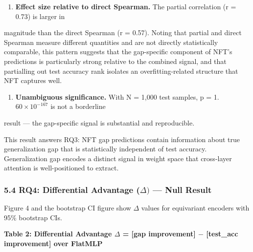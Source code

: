 \begin{enumerate}
\item \textbf{Effect size relative to direct Spearman.} The partial correlation (r = 0.73) is larger in
\end{enumerate}
   magnitude than the direct Spearman (r = 0.57). Noting that partial and direct Spearman measure
   different quantities and are not directly statistically comparable, this pattern suggests that
   the gap-specific component of NFT's predictions is particularly strong relative to the combined
   signal, and that partialling out test accuracy rank isolates an overfitting-related structure
   that NFT captures well.

\begin{enumerate}
\item \textbf{Unambiguous significance.} With N = 1,000 test samples, p = 1.$60\times 10^{-167}$ is not a borderline
\end{enumerate}
   result --- the gap-specific signal is substantial and reproducible.

This result answers RQ3: NFT gap predictions contain information about true generalization gap that is
statistically independent of test accuracy. Generalization gap encodes a distinct signal in weight space
that cross-layer attention is well-positioned to extract.

\subsubsection{5.4 RQ4: Differential Advantage ($\Delta )$ --- Null Result}

Figure 4 and the bootstrap CI figure show $\Delta$ values for equivariant encoders with 95\% bootstrap CIs.

\textbf{Table 2: Differential Advantage $\Delta$ = [gap improvement] $-$ [test\_acc improvement] over FlatMLP}

\begin{table}[htbp]
\centering
{}
\end{table}

